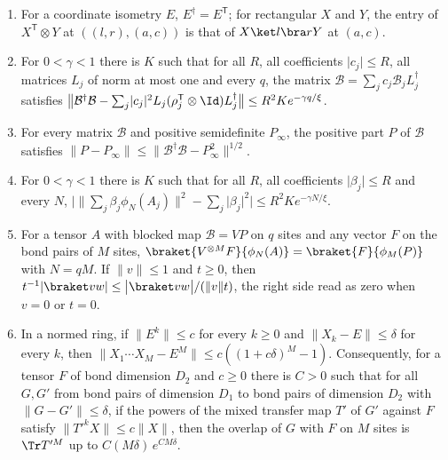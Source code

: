 \begin{lemma}
\begin{enumerate}
        \item For a coordinate isometry $E$, $E^\dagger=E^{\mathsf T}$; for rectangular
              $X$ and $Y$, the entry of $X^{\mathsf T}\otimes Y$ at $((l,r),(a,c))$ is
              that of $X\ket l\bra rY$ at $(a,c)$.
        \item For $0<\gamma<1$ there is $K$ such that for all $R$, all coefficients
              $\lvert c_j\rvert\leq R$, all matrices $L_j$ of norm at most one and every
              $q$, the matrix $\mathcal B=\sum_jc_j\mathcal B_jL_j^\dagger$ satisfies
              $\bigl\lVert\mathcal B^\dagger\mathcal B-\sum_j\lvert c_j\rvert^2
                  L_j(\rho_j^{\mathsf T}\otimes\Id)L_j^\dagger\bigr\rVert
                  \leq R^2Ke^{-\gamma q/\xi}$.
        \item For every matrix $\mathcal B$ and positive semidefinite $P_\infty$, the
              positive part $P$ of $\mathcal B$ satisfies
              $\lVert P-P_\infty\rVert\leq\lVert\mathcal B^\dagger\mathcal B-P_\infty^2
                  \rVert^{1/2}$.
        \item For $0<\gamma<1$ there is $K$ such that for all $R$, all coefficients
              $\lvert\beta_j\rvert\leq R$ and every $N$,
              $\bigl\lvert\lVert\sum_j\beta_j\phi_N(A_j)\rVert^2-\sum_j\lvert\beta_j\rvert^2
                  \bigr\rvert\leq R^2Ke^{-\gamma N/\xi}$.
        \item For a tensor $A$ with blocked map $\mathcal B=VP$ on $q$ sites and any vector
              $F$ on the bond pairs of $M$ sites,
              $\braket{V^{\otimes M}F}{\phi_N(A)}=\braket{F}{\phi_M(P)}$ with $N=qM$.
              If $\lVert v\rVert\leq1$ and $t\geq0$, then
              $t^{-1}\lvert\braket vw\rvert\leq\bigl\lvert\braket vw\bigr\rvert/
                  (\lVert v\rVert t)$, the right side read as zero when $v=0$ or $t=0$.
        \item In a normed ring, if $\lVert E^k\rVert\leq c$ for every $k\geq0$ and
              $\lVert X_k-E\rVert\leq\delta$ for every $k$, then
              $\lVert X_1\cdots X_M-E^M\rVert\leq c((1+c\delta)^M-1)$. Consequently, for
              a tensor $F$ of bond dimension $D_2$ and $c\geq0$ there is $C>0$ such that
              for all $G,G'$ from bond pairs of dimension $D_1$ to bond pairs of
              dimension $D_2$ with $\lVert G-G'\rVert\leq\delta$, if the powers of the
              mixed transfer map $T'$ of $G'$ against $F$ satisfy
              $\lVert T'^kX\rVert\leq c\lVert X\rVert$, then the overlap of $G$ with $F$
              on $M$ sites is $\Tr T'^M$ up to $C(M\delta)\,e^{CM\delta}$.
    \end{enumerate}
\end{lemma}

